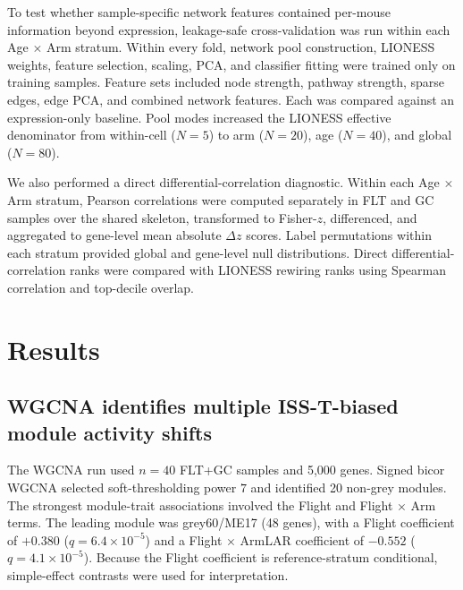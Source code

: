 \documentclass[11pt]{article}
\begin{document}
To test whether sample-specific network features contained per-mouse information beyond expression, leakage-safe cross-validation was run within each Age $\times$ Arm stratum. Within every fold, network pool construction, LIONESS weights, feature selection, scaling, PCA, and classifier fitting were trained only on training samples. Feature sets included node strength, pathway strength, sparse edges, edge PCA, and combined network features. Each was compared against an expression-only baseline. Pool modes increased the LIONESS effective denominator from within-cell ($N=5$) to arm ($N=20$), age ($N=40$), and global ($N=80$).

We also performed a direct differential-correlation diagnostic. Within each Age $\times$ Arm stratum, Pearson correlations were computed separately in FLT and GC samples over the shared skeleton, transformed to Fisher-$z$, differenced, and aggregated to gene-level mean absolute $\Delta z$ scores. Label permutations within each stratum provided global and gene-level null distributions. Direct differential-correlation ranks were compared with LIONESS rewiring ranks using Spearman correlation and top-decile overlap.

\section{Results}

\subsection{WGCNA identifies multiple ISS-T-biased module activity shifts}

The WGCNA run used $n=40$ FLT+GC samples and 5,000 genes. Signed bicor WGCNA selected soft-thresholding power $7$ and identified 20 non-grey modules. The strongest module-trait associations involved the Flight and Flight $\times$ Arm terms. The leading module was grey60/ME17 (48 genes), with a Flight coefficient of $+0.380$ ($q=6.4\times10^{-5}$) and a Flight $\times$ ArmLAR coefficient of $-0.552$ ($q=4.1\times10^{-5}$). Because the Flight coefficient is reference-stratum conditional, simple-effect contrasts were used for interpretation.
\end{document}
